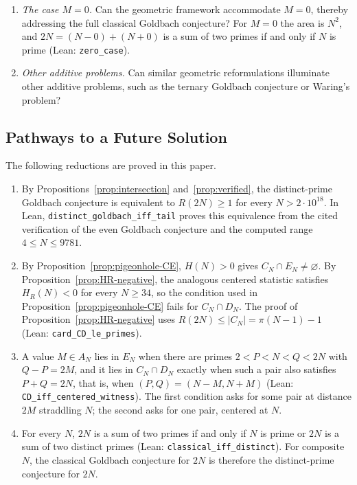 \documentclass[11pt]{amsart}
\theoremstyle{definition}
\theoremstyle{remark}
\begin{document}
\begin{enumerate}
\item[\emph{(5)}] \emph{The case $M=0$.} Can the geometric framework accommodate $M=0$, thereby addressing the full classical Goldbach conjecture? For $M=0$ the area is $N^2$, and $2N=(N-0)+(N+0)$ is a sum of two primes if and only if $N$ is prime (Lean: \texttt{zero\_case}).
\item[\emph{(6)}] \emph{Other additive problems.} Can similar geometric reformulations illuminate other additive problems, such as the ternary Goldbach conjecture or Waring's problem?
\end{enumerate}

\subsection*{Pathways to a Future Solution}
The following reductions are proved in this paper.
\begin{enumerate}
\item[\emph{(1)}] By Propositions~\ref{prop:intersection} and~\ref{prop:verified}, the distinct-prime Goldbach conjecture is equivalent to $R(2N)\geq 1$ for every $N>2\cdot 10^{18}$. In Lean, \texttt{distinct\_goldbach\_iff\_tail} proves this equivalence from the cited verification of the even Goldbach conjecture and the computed range $4\leq N\leq 9781$.
\item[\emph{(2)}] By Proposition~\ref{prop:pigeonhole-CE}, $H(N)>0$ gives $C_N\cap E_N\neq\varnothing$. By Proposition~\ref{prop:HR-negative}, the analogous centered statistic satisfies $H_R(N)<0$ for every $N\geq 34$, so the condition used in Proposition~\ref{prop:pigeonhole-CE} fails for $C_N\cap D_N$. The proof of Proposition~\ref{prop:HR-negative} uses $R(2N)\leq|C_N|=\pi(N-1)-1$ (Lean: \texttt{card\_CD\_le\_primes}).
\item[\emph{(3)}] A value $M\in A_N$ lies in $E_N$ when there are primes $2<P<N<Q<2N$ with $Q-P=2M$, and it lies in $C_N\cap D_N$ exactly when such a pair also satisfies $P+Q=2N$, that is, when $(P,Q)=(N-M,N+M)$ (Lean: \texttt{CD\_iff\_centered\_witness}). The first condition asks for some pair at distance $2M$ straddling $N$; the second asks for one pair, centered at $N$.
\item[\emph{(4)}] For every $N$, $2N$ is a sum of two primes if and only if $N$ is prime or $2N$ is a sum of two distinct primes (Lean: \texttt{classical\_iff\_distinct}). For composite $N$, the classical Goldbach conjecture for $2N$ is therefore the distinct-prime conjecture for $2N$.
\end{enumerate}
\end{document}
